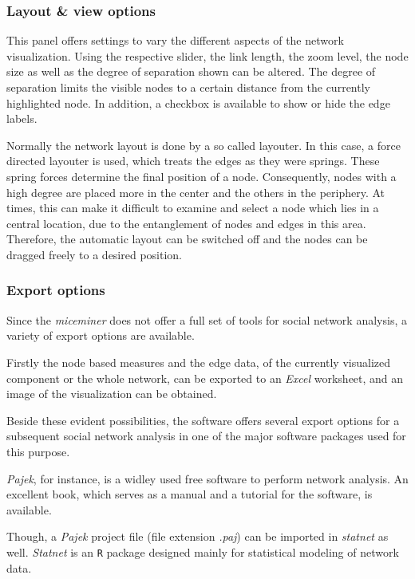 \subsubsection*{Layout \& view options}

This panel offers settings to vary the different aspects of the network visualization. Using the respective slider, the link length, the zoom level, the node size as well as the degree of separation shown can be altered. The degree of separation limits the visible nodes to a certain distance from the currently highlighted node. In addition, a checkbox is available to show or hide the edge labels.

Normally the network layout is done by a so called layouter. In this case, a force directed layouter is used, which treats the edges as they were springs. These spring forces determine the final position of a node. Consequently, nodes with a high degree are placed more in the center and the others in the periphery. At times, this can make it difficult to examine and select a node which lies in a central location, due to the entanglement of nodes and edges in this area. Therefore, the automatic layout can be switched off and the nodes can be dragged freely to a desired position.

\subsubsection*{Export options} 
\label{subsubsec:export_options}

Since the \textit{miceminer} does not offer a full set of tools for social network analysis, a variety of export options are available.

Firstly the node based measures and the edge data, of the currently visualized component or the whole network, can be exported to an \textit{Excel} worksheet, and an image of the visualization can be obtained.

Beside these evident possibilities, the software offers several export options for a subsequent social network analysis in one of the major software packages used for this purpose.

\textit{Pajek}\cite{Pajek}, for instance, is a widley used free software to perform network analysis. An excellent book\cite{pajek:03}, which serves as a manual and a tutorial for the software, is available.

Though, a \textit{Pajek} project file (file extension \textit{.paj}) can be imported in \textit{statnet}\cite{statnet:03} as well. \textit{Statnet} is an \lstinline|R|\cite{r:05} package designed mainly for statistical modeling of network data.

